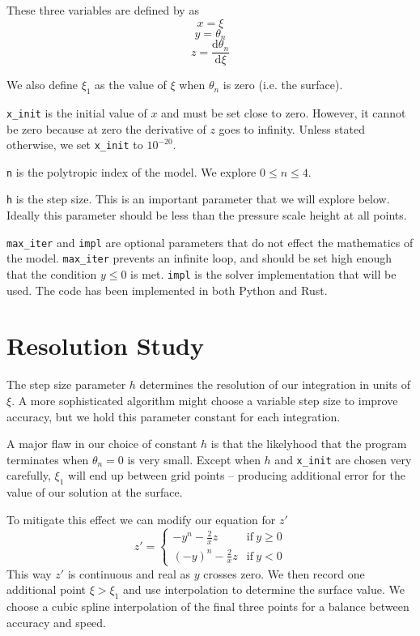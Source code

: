 \documentclass[twocolumn]{aastex631}
\begin{document}
These three variables are defined by \citet{textbook} as
\[ x = \xi\]
\[y = \theta_n\]
\[z = \frac{\text{d}\theta_n}{\text{d}\xi}\]

We also define $\xi_1$ as the value of $\xi$ when $\theta_n$ is
zero (i.e. the surface).

\texttt{x\_init} is the initial value of $x$ and must be set close to zero.
However, it cannot be zero because at zero the derivative of $z$ goes to infinity.
Unless stated otherwise, we set \texttt{x\_init} to $10^{-20}$.

\texttt{n} is the polytropic index of the model. We explore
$0\le n \le 4$.

\texttt{h} is the step size. This is an important parameter that we will
explore below. Ideally this parameter should be less than
the pressure scale height at all points.

\texttt{max\_iter} and \texttt{impl} are optional parameters that do not
effect the mathematics of the model. \texttt{max\_iter} prevents
an infinite loop, and should be set high enough that the
condition $y\le 0$ is met. \texttt{impl} is the solver
implementation that will be used. The code has been implemented
in both Python and Rust.


\section{Resolution Study}
\label{sec:res}

The step size parameter $h$ determines the resolution of our integration
in units of $\xi$. A more sophisticated algorithm might choose a variable
step size to improve accuracy, but we hold this parameter constant
for each integration.

A major flaw in our choice of constant $h$ is that the likelyhood that
the program terminates when $\theta_n=0$ is very small. Except when $h$
and \texttt{x\_init} are chosen very carefully, $\xi_1$ will end up
between grid points -- producing additional error for the value
of our solution at the surface.

To mitigate this effect we can modify our equation for $z'$
\[
    z' =
    \begin{cases}
        -y^n - \frac{2}{x}z & \text{if}~y\ge0 \\
        (-y)^n - \frac{2}{x}z & \text{if}~y<0
    \end{cases}
\]
This way $z'$ is continuous and real as $y$ crosses zero. We then
record one additional point $\xi>\xi_1$ and use interpolation
to determine the surface value. We choose a cubic spline interpolation
of the final three points for a balance between accuracy and
speed.
\end{document}
